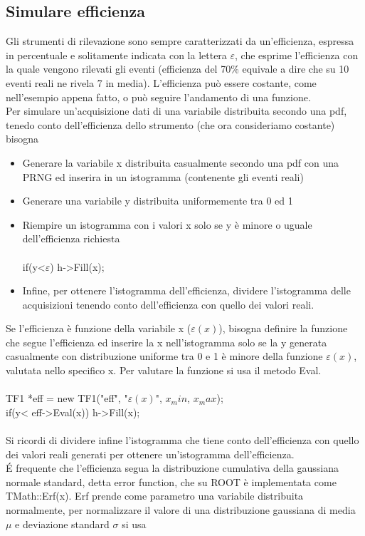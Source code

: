 \documentclass[10pt,a4paper]{article}
\begin{document}
\subsection{Simulare efficienza}
Gli strumenti di rilevazione sono sempre caratterizzati da un'efficienza, espressa in percentuale e solitamente indicata con la lettera $\varepsilon$, che esprime l'efficienza con la quale vengono rilevati gli eventi (efficienza del 70\% equivale a dire che su 10 eventi reali ne rivela 7 in media). L'efficienza può essere costante, come nell'esempio appena fatto, o può seguire l'andamento di una funzione.\\
Per simulare un'acquisizione dati di una variabile distribuita secondo una pdf, tenedo conto dell'efficienza dello strumento (che ora consideriamo costante) bisogna 
\begin{itemize}
	\item Generare la variabile x distribuita casualmente secondo una pdf con una PRNG ed inserira in un istogramma (contenente gli eventi reali)
	\item Generare una variabile y distribuita uniformemente tra 0 ed 1
	\item Riempire un istogramma con i valori x solo se y è minore o uguale dell'efficienza richiesta\\\\
	if(y<$\varepsilon$) h->Fill(x);\\
	\item Infine, per ottenere l'istogramma dell'efficienza, dividere l'istogramma delle acquisizioni tenendo conto dell'efficienza con quello dei valori reali.
\end{itemize}
Se l'efficienza è funzione della variabile x ($\varepsilon(x)$), bisogna definire la funzione che segue l'efficienza ed inserire la x nell'istogramma solo se la y generata casualmente con distribuzione uniforme tra 0 e 1 è minore della funzione $\varepsilon(x)$, valutata nello specifico x. Per valutare la funzione si usa il metodo Eval.\\\\
 TF1 *eff = new TF1("eff", "$\varepsilon(x)$", \(x_min\), \(x_max\));\\
 if(y< eff->Eval(x)) h->Fill(x);\\\\
Si ricordi di dividere infine l'istogramma che tiene conto dell'efficienza con quello dei valori reali generati per ottenere un'istogramma dell'efficienza.\\
\'E frequente che l'efficienza segua la distribuzione cumulativa della gaussiana normale standard, detta error function, che su ROOT è implementata come TMath::Erf(x). Erf prende come parametro una variabile distribuita normalmente, per normalizzare il valore di una distribuzione gaussiana di media $\mu$ e deviazione standard $\sigma$ si usa
\end{document}
